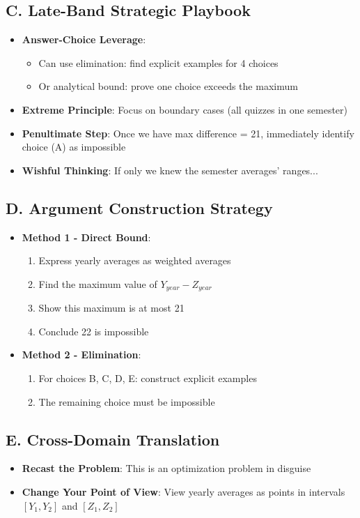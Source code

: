 \documentclass[12pt]{article}
\begin{document}
\begin{strategicbox}
\subsection*{C. Late-Band Strategic Playbook}
\begin{itemize}[leftmargin=*]
    \item \textbf{Answer-Choice Leverage}: 
    \begin{itemize}
        \item Can use elimination: find explicit examples for 4 choices
        \item Or analytical bound: prove one choice exceeds the maximum
    \end{itemize}
    \item \textbf{Extreme Principle}: Focus on boundary cases (all quizzes in one semester)
    \item \textbf{Penultimate Step}: Once we have max difference = 21, immediately identify choice (A) as impossible
    \item \textbf{Wishful Thinking}: If only we knew the semester averages' ranges...
\end{itemize}

\subsection*{D. Argument Construction Strategy}
\begin{itemize}[leftmargin=*]
    \item \textbf{Method 1 - Direct Bound}: 
    \begin{enumerate}
        \item Express yearly averages as weighted averages
        \item Find the maximum value of $Y_{year} - Z_{year}$
        \item Show this maximum is at most 21
        \item Conclude 22 is impossible
    \end{enumerate}
    \item \textbf{Method 2 - Elimination}: 
    \begin{enumerate}
        \item For choices B, C, D, E: construct explicit examples
        \item The remaining choice must be impossible
    \end{enumerate}
\end{itemize}

\subsection*{E. Cross-Domain Translation}
\begin{itemize}[leftmargin=*]
    \item \textbf{Recast the Problem}: This is an optimization problem in disguise
    \item \textbf{Change Your Point of View}: View yearly averages as points in intervals $[Y_1, Y_2]$ and $[Z_1, Z_2]$
\end{itemize}
\end{strategicbox}
\end{document}
